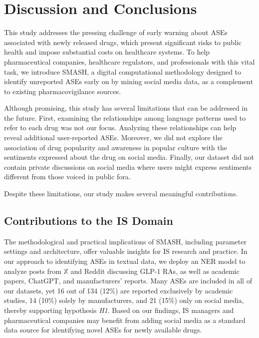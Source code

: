 \documentclass[referee,bst/sn-basic]{sn-jnl}%
\begin{document}
\section{Discussion and Conclusions}
\label{sec:discussion}
This study addresses the pressing challenge of early warning about ASEs associated with newly released drugs, which present significant risks to public health and impose substantial costs on healthcare systems. 
To help pharmaceutical companies, healthcare regulators, and professionals with this vital task, we introduce SMASH, a digital computational methodology designed to identify unreported ASEs early on by mining social media data, as a complement to existing pharmacovigilance sources. 

Although promising, this study has several limitations that can be addressed in the future.
First, examining the relationships among language patterns used to refer to each drug was not our focus.
Analyzing these relationships can help reveal additional user-reported ASEs.
Moreover, we did not explore the association of drug popularity and awareness in popular culture with the sentiments expressed about the drug on social media.
Finally, our dataset did not contain private discussions on social media where users might express sentiments different from those voiced in public fora.

Despite these limitations, our study makes several meaningful contributions.

\subsection{Contributions to the IS Domain}
The methodological and practical implications of SMASH, including parameter settings and architecture, offer valuable insights for IS research and practice.
In our approach to identifying ASEs in textual data, we deploy an NER model to analyze posts from $\mathbb{X}$ and Reddit discussing GLP-1 RAs, as well as academic papers, ChatGPT, and manufacturers' reports.
Many ASEs are included in all of our datasets, yet 16 out of 134 (12\%) are reported exclusively by academic studies, 14 (10\%) solely by manufacturers, and 21 (15\%) only on social media, thereby supporting hypothesis \textit{H1}. 
Based on our findings, IS managers and pharmaceutical companies may benefit from adding social media as a standard data source for identifying novel ASEs for newly available drugs.
\end{document}
